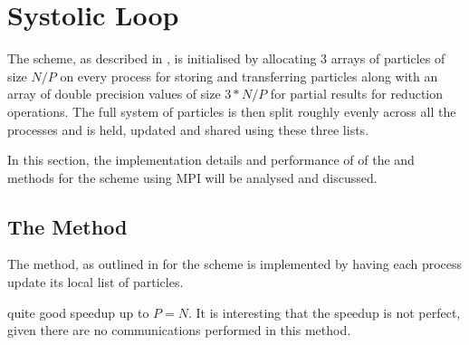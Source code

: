 \section{Systolic Loop}

%
The \systolicloop{} scheme, as described in
,
is initialised by allocating 3 arrays of particles of
size $N/P$ on every process for storing and transferring particles
along with an array of double precision values of size $3*N/P$ for
partial results for reduction operations.
%
The full system of particles is then
split roughly evenly across all the processes
and is held, updated and shared using these three lists.

In this section, the implementation details and performance of
of the \individualoperation{} and \pairoperation{} methods
for the \systolicloop{} scheme using MPI will be analysed and discussed.


%
%

\subsection{The \individualoperation{} Method}

The \individualoperation{} method, as outlined in
for the \systolicloop{} scheme
is implemented by having each process update its local list of particles.


%
%
\begin{figure}[!h]
    
    \caption{
        \vZeroSpeedupCaption
            {\systolicloop{}}
            {\individualoperation{}}
    }
    \label{fig:v0_systolic_individual_operation_speedups}
\end{figure}


\vZeroSpeedupExplanation
    {}
    {\systolicloop{}}
    {\individualoperation{}}


%

 quite good speedup
up to $P = N$.
%
It is interesting that the speedup is not perfect, given there are
no communications performed in this method.

